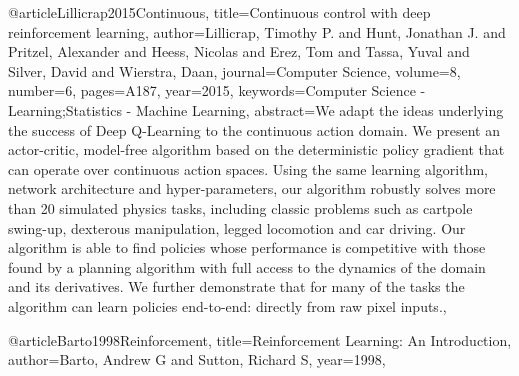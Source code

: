 @article{Lillicrap2015Continuous,
  title={Continuous control with deep reinforcement learning},
  author={Lillicrap, Timothy P. and Hunt, Jonathan J. and Pritzel, Alexander and Heess, Nicolas and Erez, Tom and Tassa, Yuval and Silver, David and Wierstra, Daan},
  journal={Computer Science},
  volume={8},
  number={6},
  pages={A187},
  year={2015},
 keywords={Computer Science - Learning;Statistics - Machine Learning},
 abstract={We adapt the ideas underlying the success of Deep Q-Learning to the continuous action domain. We present an actor-critic, model-free algorithm based on the deterministic policy gradient that can operate over continuous action spaces. Using the same learning algorithm, network architecture and hyper-parameters, our algorithm robustly solves more than 20 simulated physics tasks, including classic problems such as cartpole swing-up, dexterous manipulation, legged locomotion and car driving. Our algorithm is able to find policies whose performance is competitive with those found by a planning algorithm with full access to the dynamics of the domain and its derivatives. We further demonstrate that for many of the tasks the algorithm can learn policies end-to-end: directly from raw pixel inputs.},
}

@article{Barto1998Reinforcement,
  title={Reinforcement Learning: An Introduction},
  author={Barto, Andrew G and Sutton, Richard S},
  year={1998},
}

